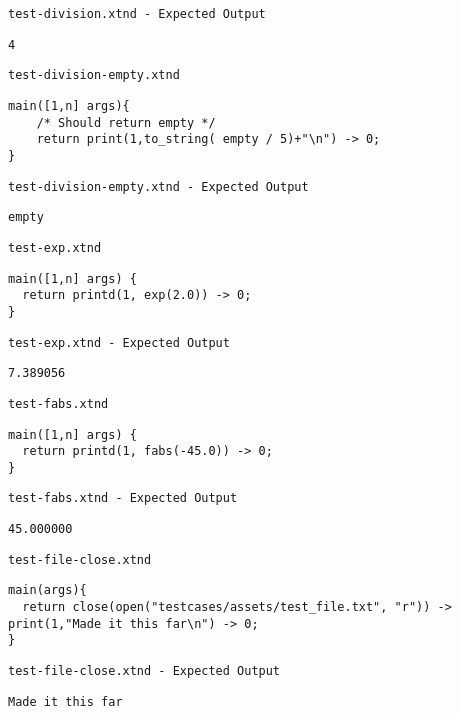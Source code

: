 \medskip \noindent \texttt{test-division.xtnd - Expected Output}


\begin{lstlisting}
4
\end{lstlisting}


\medskip \noindent \texttt{test-division-empty.xtnd}


\begin{lstlisting}
main([1,n] args){
	/* Should return empty */
	return print(1,to_string( empty / 5)+"\n") -> 0;
}
\end{lstlisting}


\medskip \noindent \texttt{test-division-empty.xtnd - Expected Output}


\begin{lstlisting}
empty
\end{lstlisting}


\medskip \noindent \texttt{test-exp.xtnd}


\begin{lstlisting}
main([1,n] args) {
  return printd(1, exp(2.0)) -> 0;
}
\end{lstlisting}


\medskip \noindent \texttt{test-exp.xtnd - Expected Output}


\begin{lstlisting}
7.389056
\end{lstlisting}


\medskip \noindent \texttt{test-fabs.xtnd}


\begin{lstlisting}
main([1,n] args) {
  return printd(1, fabs(-45.0)) -> 0;
}
\end{lstlisting}


\medskip \noindent \texttt{test-fabs.xtnd - Expected Output}


\begin{lstlisting}
45.000000
\end{lstlisting}


\medskip \noindent \texttt{test-file-close.xtnd}


\begin{lstlisting}
main(args){
  return close(open("testcases/assets/test_file.txt", "r")) -> print(1,"Made it this far\n") -> 0;
}
\end{lstlisting}


\medskip \noindent \texttt{test-file-close.xtnd - Expected Output}


\begin{lstlisting}
Made it this far
\end{lstlisting}


